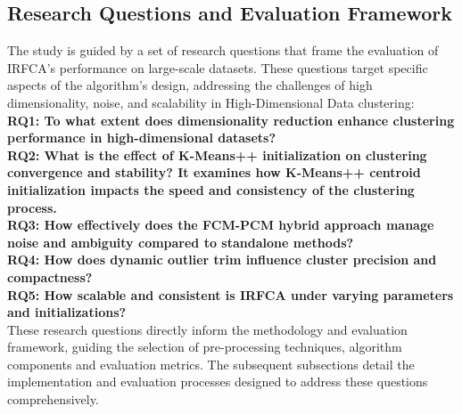 \documentclass[twoside,11pt]{article}
\begin{document}
\subsection{Research Questions and Evaluation Framework}
The study is guided by a set of research questions that frame the evaluation of IRFCA’s performance on large-scale datasets. These questions target specific aspects of the algorithm’s design, addressing the challenges of high dimensionality, noise, and scalability in High-Dimensional Data clustering:\\
\textbf{RQ1: To what extent does dimensionality reduction enhance clustering performance in high-dimensional datasets?\\
RQ2: What is the effect of K-Means++ initialization on clustering convergence and stability?
It examines how K-Means++ centroid initialization impacts the speed and consistency of the clustering process.\\
RQ3: How effectively does the FCM-PCM hybrid approach manage noise and ambiguity compared to standalone methods?\\
RQ4: How does dynamic outlier trim influence cluster precision and compactness?\\
RQ5: How scalable and consistent is IRFCA under varying parameters and initializations?}\\
These research questions directly inform the methodology and evaluation framework, guiding the selection of pre-processing techniques, algorithm components and evaluation metrics. The subsequent subsections detail the implementation and evaluation processes designed to address these questions comprehensively.
\end{document}
